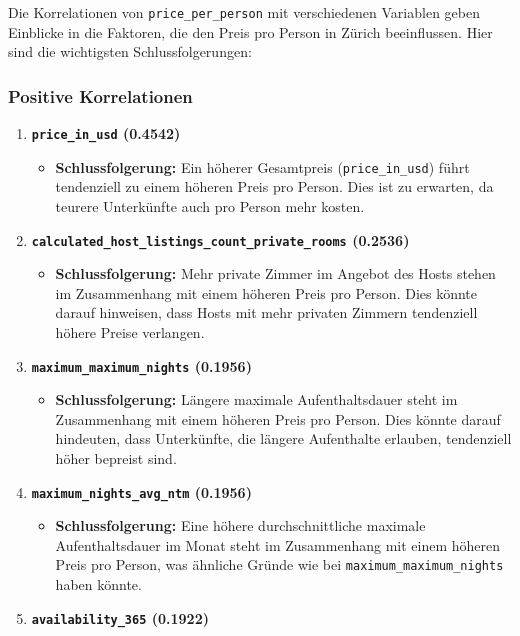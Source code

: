 \documentclass[
  journal,
]{IEEEtran}%
\providecommand{\tightlist}{%
  \setlength{\itemsep}{0pt}\setlength{\parskip}{0pt}}\usepackage{longtable,booktabs,array}
\begin{document}
Die Korrelationen von \texttt{price\_per\_person} mit verschiedenen
Variablen geben Einblicke in die Faktoren, die den Preis pro Person in
Zürich beeinflussen. Hier sind die wichtigsten Schlussfolgerungen:

\subsubsection{Positive Korrelationen}\label{positive-korrelationen}

\begin{enumerate}
\def\labelenumi{\arabic{enumi}.}
\item
  \textbf{\texttt{price\_in\_usd} (0.4542)}

  \begin{itemize}
  \tightlist
  \item
    \textbf{Schlussfolgerung:} Ein höherer Gesamtpreis
    (\texttt{price\_in\_usd}) führt tendenziell zu einem höheren Preis
    pro Person. Dies ist zu erwarten, da teurere Unterkünfte auch pro
    Person mehr kosten.
  \end{itemize}
\item
  \textbf{\texttt{calculated\_host\_listings\_count\_private\_rooms}
  (0.2536)}

  \begin{itemize}
  \tightlist
  \item
    \textbf{Schlussfolgerung:} Mehr private Zimmer im Angebot des Hosts
    stehen im Zusammenhang mit einem höheren Preis pro Person. Dies
    könnte darauf hinweisen, dass Hosts mit mehr privaten Zimmern
    tendenziell höhere Preise verlangen.
  \end{itemize}
\item
  \textbf{\texttt{maximum\_maximum\_nights} (0.1956)}

  \begin{itemize}
  \tightlist
  \item
    \textbf{Schlussfolgerung:} Längere maximale Aufenthaltsdauer steht
    im Zusammenhang mit einem höheren Preis pro Person. Dies könnte
    darauf hindeuten, dass Unterkünfte, die längere Aufenthalte
    erlauben, tendenziell höher bepreist sind.
  \end{itemize}
\item
  \textbf{\texttt{maximum\_nights\_avg\_ntm} (0.1956)}

  \begin{itemize}
  \tightlist
  \item
    \textbf{Schlussfolgerung:} Eine höhere durchschnittliche maximale
    Aufenthaltsdauer im Monat steht im Zusammenhang mit einem höheren
    Preis pro Person, was ähnliche Gründe wie bei
    \texttt{maximum\_maximum\_nights} haben könnte.
  \end{itemize}
\item
  \textbf{\texttt{availability\_365} (0.1922)}


\end{enumerate}
\end{document}
